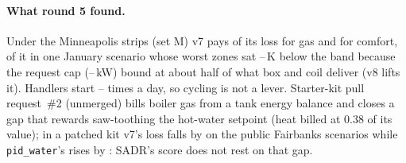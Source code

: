 \documentclass{article}
\begin{document}
\paragraph{What round 5 found.}
Under the Minneapolis strips (set M) v7 pays \RFiveDecMinnGasShare{} of its loss for gas and
\RFiveDecMinnComfortShare{} for comfort, \RFiveCapComfortShareOfMinn{} of it in one January scenario whose
\RFiveCapNZones{} worst zones sat \RFiveCapDefMin--\RFiveCapDefMax\,K below the band because the request cap
(\RFiveCapReqKwMin--\RFiveCapReqKwMax\,kW) bound at about half of what box and coil deliver (v8 lifts it). Handlers
start \RFiveAhuStartsMin--\RFiveAhuStartsMax{} times a day, so cycling is not a lever. Starter-kit pull request~\#2
(unmerged) bills boiler gas from a tank energy balance and closes a gap that rewards saw-toothing the hot-water
setpoint (heat billed at 0.38 of its value); in a patched kit v7's loss falls by \RFivePrTwoVSevenRelAbs{} on the
\RFivePrTwoVSevenN{} public Fairbanks scenarios while \texttt{pid\_water}'s rises by \RFivePrTwoPidRelAbs: SADR's score
does not rest on that gap.
\end{document}
